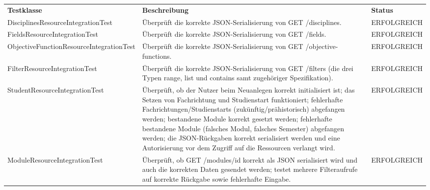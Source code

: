 \begin{longtable}{| >{\hspace{0pt}} p{} | >{\hspace{0pt}} p{} | >{\hspace{0pt}} p{} |}
	\hline
	\textbf{Testklasse} & \textbf{Beschreibung} & \textbf{Status} \\ 
	\hhline{|=|=|=|}  
	\endfirsthead
	\endhead
	DisciplinesResourceIntegrationTest & Überprüft die korrekte JSON-Serialisierung von GET /disciplines. & ERFOLGREICH \\
	\hline
	FieldsResourceIntegrationTest & Überprüft die korrekte JSON-Serialisierung von GET /fields. & ERFOLGREICH \\
	\hline
	ObjectiveFunctionResourceIntegrationTest & Überprüft die korrekte JSON-Serialisierung von GET /objective-functions. & ERFOLGREICH \\
	\hline
	FilterResourceIntegrationTest & Überprüft die korrekte JSON-Serialisierung von GET /filters (die drei Typen range, list und contains samt zugehöriger Spezifikation). & ERFOLGREICH \\
	\hline
	StudentResourceIntegrationTest & Überprüft, ob der Nutzer beim Neuanlegen korrekt initialisiert ist; das Setzen von Fachrichtung und Studienstart funktioniert; fehlerhafte Fachrichtungen/Studienstarts (zukünftig/prähistorisch) abgefangen werden; bestandene Module korrekt gesetzt werden; fehlerhafte bestandene Module (falsches Modul, falsches Semester) abgefangen werden; die JSON-Rückgaben korrekt serialisiert werden und eine Autorisierung vor dem Zugriff auf die Ressourcen verlangt wird. & ERFOLGREICH \\
	\hline
	ModuleResourceIntegrationTest & Überprüft, ob GET /modules/id korrekt als JSON serialisiert wird und auch die korrekten Daten gesendet werden; testet mehrere Filteraufrufe auf korrekte Rückgabe sowie fehlerhafte Eingabe. & ERFOLGREICH \\
	\hline
	

\end{longtable}

